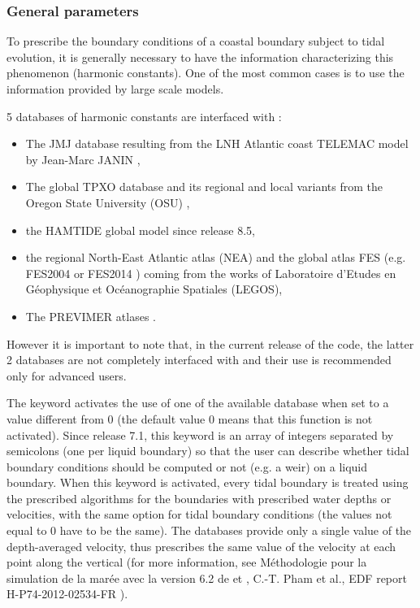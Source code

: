 \subsubsection{General parameters}

To prescribe the boundary conditions of a coastal boundary subject to tidal
evolution, it is generally necessary to have the information characterizing
this phenomenon (harmonic constants). One of the most common cases is to use
the information provided by large scale models.

5 databases of harmonic constants are interfaced with :

\begin{itemize}
\item The JMJ database resulting from the LNH Atlantic coast TELEMAC model
by Jean-Marc JANIN \cite{Janin1992},

\item The global TPXO database and its regional and local variants from
the Oregon State University (OSU) \cite{Egbert2022},

\item the HAMTIDE global model \cite{Taguchi2014} since release 8.5,

\item the regional North-East Atlantic atlas (NEA) \cite{Pairaud2008,Pairaud2010}
and the global atlas FES
(e.g. FES2004 or FES2014 \cite{Lyard2021}) coming from the works of Laboratoire
d'Etudes en Géophysique et Océanographie Spatiales (LEGOS),

\item The PREVIMER atlases \cite{Pineau2013}.
\end{itemize}

However it is important to note that, in the current release of the code, the
latter 2 databases are not completely interfaced with  and their use
is recommended only for advanced users.

The keyword  activates the use of
one of the available database when set to a value different from 0
(the default value 0 means that this function is not activated).
Since release 7.1, this keyword is an array of integers separated by semicolons
(one per liquid boundary) so that the user can describe whether tidal boundary
conditions should be computed or not (e.g. a weir) on a liquid boundary.
When this keyword is activated, every tidal
boundary is treated using the prescribed algorithms for the boundaries with
prescribed water depths or velocities, with the same option for tidal boundary
conditions (the values not equal to 0 have to be the same).
The databases provide only a single value of the
depth-averaged velocity, thus  prescribes the same value of the
velocity at each point along the vertical (for more information, see
Méthodologie pour la simulation de la marée avec la version 6.2 de 
et , C.-T. Pham et al., EDF report H-P74-2012-02534-FR
\cite{Pham2012}).

